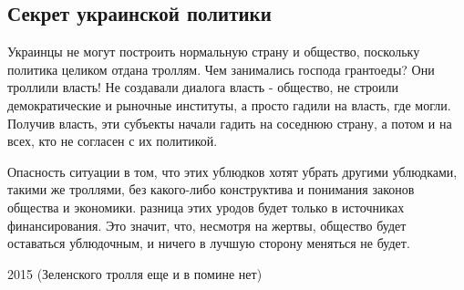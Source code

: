  
 
 
 
 

\subsection{Секрет украинской политики}
\label{sec:17_05_2021.fb.zharkih_denis.1.sekret_politika}

Украинцы не могут построить нормальную страну и общество, поскольку политика
целиком отдана троллям. Чем занимались господа грантоеды? Они троллили власть!
Не создавали диалога власть - общество, не строили демократические и рыночные
институты, а просто гадили на власть, где могли. Получив власть, эти субъекты
начали гадить на соседнюю страну, а потом и на всех, кто не согласен с их
политикой. 

Опасность ситуации в том, что этих ублюдков хотят убрать другими ублюдками,
такими же троллями, без какого-либо конструктива и понимания законов общества и
экономики. разница этих уродов будет только в источниках финансирования. Это
значит, что, несмотря на жертвы, общество будет оставаться ублюдочным, и ничего
в лучшую сторону меняться не будет.

2015 (Зеленского тролля еще и в помине нет)
